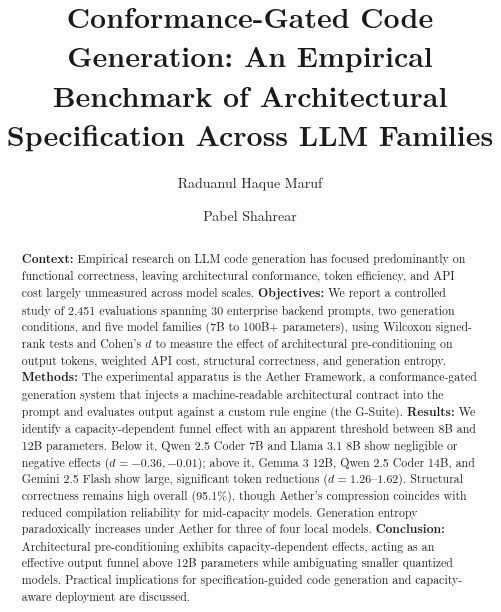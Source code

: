 \documentclass[review,12pt,3p]{elsarticle}
\begin{document}
\begin{frontmatter}

\title{Conformance-Gated Code Generation: An Empirical Benchmark of Architectural Specification Across LLM Families}

\author[inst1]{Raduanul Haque Maruf}

\author[inst2]{Pabel Shahrear}




\begin{abstract}
\textbf{Context:}
Empirical research on LLM code generation has focused predominantly on functional correctness, leaving architectural conformance, token efficiency, and API cost largely unmeasured across model scales.
%
\textbf{Objectives:}
We report a controlled study of 2,451 evaluations spanning 30 enterprise backend prompts, two generation conditions, and five model families (7B to 100B+ parameters), using Wilcoxon signed-rank tests and Cohen's $d$ to measure the effect of architectural pre-conditioning on output tokens, weighted API cost, structural correctness, and generation entropy.
%
\textbf{Methods:}
The experimental apparatus is the Aether Framework, a conformance-gated generation system that injects a machine-readable architectural contract into the prompt and evaluates output against a custom rule engine (the G-Suite).
%
\textbf{Results:}
We identify a capacity-dependent funnel effect with an apparent threshold between 8B and 12B parameters. Below it, Qwen 2.5 Coder 7B and Llama 3.1 8B show negligible or negative effects ($d = -0.36, -0.01$); above it, Gemma 3 12B, Qwen 2.5 Coder 14B, and Gemini 2.5 Flash show large, significant token reductions ($d = 1.26\text{--}1.62$). Structural correctness remains high overall (95.1\%), though Aether's compression coincides with reduced compilation reliability for mid-capacity models. Generation entropy paradoxically increases under Aether for three of four local models.
%
\textbf{Conclusion:}
Architectural pre-conditioning exhibits capacity-dependent effects, acting as an effective output funnel above 12B parameters while ambiguating smaller quantized models. Practical implications for specification-guided code generation and capacity-aware deployment are discussed.
\end{abstract}


\end{frontmatter}
\end{document}
